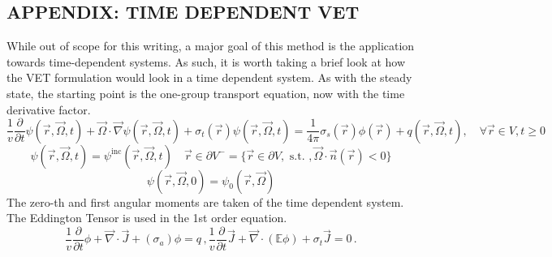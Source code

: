 \documentclass[12pt]{report}
\newcommand{\vr}{\vec{r}}
\newcommand{\vO}{\vec{\Omega}}
\renewcommand{\div}{\vec{\nabla} \cdot}
\newcommand{\grad}{\vec{\nabla}}
\newcommand{\Edd}{\mathbb{E}}
\newcommand{\sigt}{\sigma_t}
\newcommand{\sigs}{\sigma_s}
\newcommand{\siga}{\sigma_a}
\newcommand{\scalSource}{q}
\begin{document}
\newpage
\begin{appendices}
\renewcommand{\appendixname}{APPENDIX}

\chapter{ \uppercase{APPENDIX: Time Dependent VET} } \label{chap:appx1}
While out of scope for this writing, a major goal of this method is the application towards time-dependent systems. As such, it is worth taking a brief look at how the VET formulation would look in a time dependent system. As with the steady state, the starting point is the one-group transport equation, now with the time derivative factor.
\begin{equation}
\label{Trans1GTE}
\frac{1}{v} \frac{\partial}{\partial t} \psi(\vr,\vO,t)+ \vO \cdot \grad \psi(\vr,\vO,t) + \sigt(\vr) \psi(\vr,\vO,t) = \frac{1}{4 \pi} \sigs(\vr) \phi(\vr) + q(\vr,\vO,t), \quad \forall \vr \in V,t \geq 0
\end{equation}
\begin{equation}
\label{Trans1GTE_bc}
\psi(\vr,\vO,t) = \psi^{\text{inc}}(\vr,\vO,t) \quad \vr \in \partial V^{-} = \{ \vr \in \partial V, \text{ s.t. }, \vO \cdot \vec{n}(\vr) < 0\}
\end{equation}
\begin{equation}
\label{Trans1GTE_t0}
\psi(\vr,\vO,0) = \psi_0(\vr,\vO)
\end{equation}
The zero-th and first angular moments are taken of the time dependent system. The Eddington Tensor is used in the 1st order equation.
\begin{subequations}
%
\begin{equation}
\label{0amTrans}
\frac{1}{v} \frac{\partial}{\partial t}\phi + \div \vec{J} + (\siga) \phi = \scalSource \,,
\end{equation}
%
\begin{equation}
\label{1amTrans}
\frac{1}{v} \frac{\partial}{\partial t}\vec{J}  + \div \left( \Edd \phi \right) + \sigt \vec{J} = 0 \,.
\end{equation}

\end{subequations}
\end{appendices}
\end{document}
